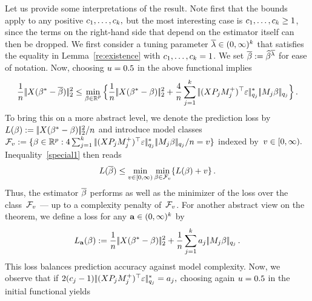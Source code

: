\documentclass[bj]{imsart}
\newcommand{\normtwo}[1]{\ensuremath{\!|\!| #1 | \! |_{2}}}
\newcommand{\normqj}[1]{\ensuremath{\!|\!| #1 | \! |_{q_j}}}
\newcommand{\normqjd}[1]{\ensuremath{\!|\!| #1 | \! |_{q_j}^*}}
\newcommand{\1}{{\rm 1}\mskip -4,5mu{\rm l} }
\def\R{\mathbb{R}}
\newcommand{\est}{\widehat\beta}
\newcommand{\betatrue}{\beta^*}
\newcommand{\lo}{\overline{\lambda}}
\newcommand{\genbeta}{\textcolor{black}{\beta}}
\newcommand{\genconstant}{\textcolor{black}{\ensuremath{u}}}
\newcommand{\riskconst}{\textcolor{black}{\ensuremath{a}}}
\newcommand{\Riskconst}{{\ensuremath{\bf \riskconst}}}
\newcommand{\Loss}{\textcolor{black}{\ensuremath{L}}}
\newcommand{\Lossa}{\textcolor{black}{\ensuremath{L_\Riskconst}}}
\newcommand{\constv}{\textcolor{black}{v}}
\newcommand{\classv}{\ensuremath{\mathcal F_{\constv}}}
\begin{document}
Let us provide some interpretations of the result. 
Note first that the bounds apply to any positive $\textcolor{black}{c}_1,\dots,\textcolor{black}{c}_{k},$ but the most interesting case is $\textcolor{black}{c}_1,\dots,\textcolor{black}{c}_{k}\geq 1$, since the terms on the right-hand side that depend on the estimator itself can then be dropped. 
We first consider a tuning parameter $\lo\in (0,\infty)^\numbergroups$  that satisfies the equality in Lemma~\ref{re:existence} with $\textcolor{black}{c}_1,\dots,\textcolor{black}{c}_{k}=1$.
We set $\estimatororacle:=\est^{\lo}$ for ease of notation. Now, choosing $\genconstant=0.5$ in the above functional implies
\begin{equation}\label{special1}
  \frac{1}{n}\,\normtwo{\design(\betatrue-\estimatororacle)}^2\le\min_{\substack{\genbeta\in\R^p}} \Big\{\frac{1}{n}\,\normtwo{\design(\betatrue-\genbeta)}^2+\frac{4}{n}\sum_{j=1}^{\numbergroups}\,  \normqjd{(\design  \projectionmatrix_j\fusedmatrix_j^{+})^\top\noise}  \, \normqj{\fusedmatrix_j \genbeta}\Big\}\,.
\end{equation}
To bring this on a more abstract level, we denote the prediction loss by $\Loss(\genbeta):=\,\normtwo{\design(\betatrue-\genbeta)}^2/n$ and introduce model classes $\classv:=\{\genbeta\in\R^p:4\sum_{j=1}^{\numbergroups}\,  \normqjd{(\design  \projectionmatrix_j\fusedmatrix_j^{+})^\top\noise}  \, \normqj{\fusedmatrix_j \genbeta}/n=\constv\}$ indexed by~$\constv\in[0,\infty).$ Inequality~\eqref{special1} then reads
\begin{equation*}
  \Loss(\estimatororacle)\leq\min_{\constv\in[0,\infty)}\min_{\genbeta\in\classv}\{\Loss(\genbeta)+\constv\}\,.
\end{equation*}
Thus, the estimator $\overline \beta$ performs as well as the minimizer of the loss over the class~$\classv$ --- up to a complexity penalty of~\classv. For another abstract view on the theorem, we define a loss for any $\Riskconst\in(0,\infty)^\numbergroups$ by
\begin{equation*}
  \Lossa(\beta):=\frac{1}{n}\,\normtwo{\design(\betatrue-\genbeta)}^2 +\frac{1}{n}\sum_{j=1}^{\numbergroups}\riskconst_j \,  \normqj{\fusedmatrix_j \genbeta}\,.
\end{equation*}
This loss balances prediction accuracy against model complexity.
Now, we observe that if $2(\tuningrelax_j-1)\,\normqjd{(\design\projectionmatrix_j\fusedmatrix_j^{+})^\top\noise}=\riskconst_j,$ choosing again $\genconstant=0.5$ in the initial functional yields
\end{document}
